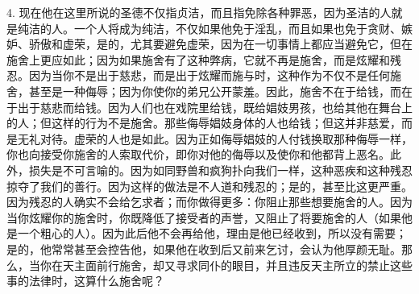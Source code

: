 4. 现在他在这里所说的圣德不仅指贞洁，而且指免除各种罪恶，因为圣洁的人就是纯洁的人。一个人将成为纯洁，不仅如果他免于淫乱，而且如果也免于贪财、嫉妒、骄傲和虚荣，是的，尤其要避免虚荣，因为在一切事情上都应当避免它，但在施舍上更应如此；因为如果施舍有了这种弊病，它就不再是施舍，而是炫耀和残忍。因为当你不是出于慈悲，而是出于炫耀而施与时，这种作为不仅不是任何施舍，甚至是一种侮辱；因为你使你的弟兄公开蒙羞。因此，施舍不在于给钱，而在于出于慈悲而给钱。因为人们也在戏院里给钱，既给娼妓男孩，也给其他在舞台上的人；但这样的行为不是施舍。那些侮辱娼妓身体的人也给钱；但这并非慈爱，而是无礼对待。虚荣的人也是如此。因为正如侮辱娼妓的人付钱换取那种侮辱一样，你也向接受你施舍的人索取代价，即你对他的侮辱以及使你和他都背上恶名。此外，损失是不可言喻的。因为如同野兽和疯狗扑向我们一样，这种恶疾和这种残忍掠夺了我们的善行。因为这样的做法是不人道和残忍的；是的，甚至比这更严重。因为残忍的人确实不会给乞求者；而你做得更多：你阻止那些想要施舍的人。因为当你炫耀你的施舍时，你既降低了接受者的声誉，又阻止了将要施舍的人（如果他是一个粗心的人）。因为此后他不会再给他，理由是他已经收到，所以没有需要；是的，他常常甚至会控告他，如果他在收到后又前来乞讨，会认为他厚颜无耻。那么，当你在天主面前行施舍，却又寻求同仆的眼目，并且违反天主所立的禁止这些事的法律时，这算什么施舍呢？\par

